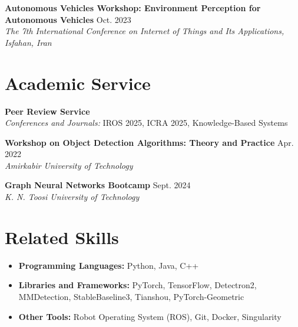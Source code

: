 \documentclass[10pt, letterpaper]{article}
\begin{document}
    \noindent\textbf{Autonomous Vehicles Workshop: Environment Perception for Autonomous Vehicles} \hfill {Oct. 2023} \\
    \textit{The 7th International Conference on Internet of Things and Its Applications, Isfahan, Iran}
    

\section*{\textcolor{primaryColor}{Academic Service}}
    \noindent\textbf{Peer Review Service} \\
    \textit{Conferences and Journals:} IROS 2025, ICRA 2025, Knowledge-Based Systems
    
    \noindent\textbf{Workshop on Object Detection Algorithms: Theory and Practice} \hfill {Apr. 2022}\\
    \textit{Amirkabir University of Technology}
    
    \noindent\textbf{Graph Neural Networks Bootcamp} \hfill {Sept. 2024}\\
    \textit{K. N. Toosi University of Technology}

\section*{\textcolor{primaryColor}{Related Skills}}
\begin{itemize}[leftmargin=0.5cm]
    \item \textbf{Programming Languages:} Python, Java, C++
    \item \textbf{Libraries and Frameworks:} PyTorch, TensorFlow, Detectron2, MMDetection, StableBaseline3, Tianshou, PyTorch-Geometric
    \item \textbf{Other Tools:} Robot Operating System (ROS), Git, Docker, Singularity
\end{itemize}
    
\end{document}
